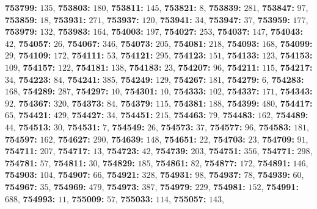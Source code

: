 \textsf{\bfseries 753799:} $135$, \textsf{\bfseries 753803:} $180$, \textsf{\bfseries 753811:} $145$, \textsf{\bfseries 753821:} $8$, \textsf{\bfseries 753839:} $281$, \textsf{\bfseries 753847:} $97$, \textsf{\bfseries 753859:} $18$, \textsf{\bfseries 753931:} $271$, \textsf{\bfseries 753937:} $120$, \textsf{\bfseries 753941:} $34$, \textsf{\bfseries 753947:} $37$, \textsf{\bfseries 753959:} $177$, \textsf{\bfseries 753979:} $132$, \textsf{\bfseries 753983:} $164$, \textsf{\bfseries 754003:} $197$, \textsf{\bfseries 754027:} $253$, \textsf{\bfseries 754037:} $147$, \textsf{\bfseries 754043:} $42$, \textsf{\bfseries 754057:} $26$, \textsf{\bfseries 754067:} $346$, \textsf{\bfseries 754073:} $205$, \textsf{\bfseries 754081:} $218$, \textsf{\bfseries 754093:} $168$, \textsf{\bfseries 754099:} $29$, \textsf{\bfseries 754109:} $172$, \textsf{\bfseries 754111:} $53$, \textsf{\bfseries 754121:} $295$, \textsf{\bfseries 754123:} $151$, \textsf{\bfseries 754133:} $123$, \textsf{\bfseries 754153:} $109$, \textsf{\bfseries 754157:} $122$, \textsf{\bfseries 754181:} $138$, \textsf{\bfseries 754183:} $23$, \textsf{\bfseries 754207:} $96$, \textsf{\bfseries 754211:} $115$, \textsf{\bfseries 754217:} $34$, \textsf{\bfseries 754223:} $84$, \textsf{\bfseries 754241:} $385$, \textsf{\bfseries 754249:} $129$, \textsf{\bfseries 754267:} $181$, \textsf{\bfseries 754279:} $6$, \textsf{\bfseries 754283:} $168$, \textsf{\bfseries 754289:} $287$, \textsf{\bfseries 754297:} $10$, \textsf{\bfseries 754301:} $10$, \textsf{\bfseries 754333:} $102$, \textsf{\bfseries 754337:} $171$, \textsf{\bfseries 754343:} $92$, \textsf{\bfseries 754367:} $320$, \textsf{\bfseries 754373:} $84$, \textsf{\bfseries 754379:} $115$, \textsf{\bfseries 754381:} $188$, \textsf{\bfseries 754399:} $480$, \textsf{\bfseries 754417:} $65$, \textsf{\bfseries 754421:} $429$, \textsf{\bfseries 754427:} $34$, \textsf{\bfseries 754451:} $215$, \textsf{\bfseries 754463:} $79$, \textsf{\bfseries 754483:} $162$, \textsf{\bfseries 754489:} $44$, \textsf{\bfseries 754513:} $30$, \textsf{\bfseries 754531:} $7$, \textsf{\bfseries 754549:} $26$, \textsf{\bfseries 754573:} $37$, \textsf{\bfseries 754577:} $96$, \textsf{\bfseries 754583:} $181$, \textsf{\bfseries 754597:} $162$, \textsf{\bfseries 754627:} $290$, \textsf{\bfseries 754639:} $148$, \textsf{\bfseries 754651:} $22$, \textsf{\bfseries 754703:} $23$, \textsf{\bfseries 754709:} $91$, \textsf{\bfseries 754711:} $207$, \textsf{\bfseries 754717:} $13$, \textsf{\bfseries 754723:} $42$, \textsf{\bfseries 754739:} $203$, \textsf{\bfseries 754751:} $356$, \textsf{\bfseries 754771:} $298$, \textsf{\bfseries 754781:} $57$, \textsf{\bfseries 754811:} $30$, \textsf{\bfseries 754829:} $185$, \textsf{\bfseries 754861:} $82$, \textsf{\bfseries 754877:} $172$, \textsf{\bfseries 754891:} $146$, \textsf{\bfseries 754903:} $104$, \textsf{\bfseries 754907:} $66$, \textsf{\bfseries 754921:} $328$, \textsf{\bfseries 754931:} $98$, \textsf{\bfseries 754937:} $78$, \textsf{\bfseries 754939:} $60$, \textsf{\bfseries 754967:} $35$, \textsf{\bfseries 754969:} $479$, \textsf{\bfseries 754973:} $387$, \textsf{\bfseries 754979:} $229$, \textsf{\bfseries 754981:} $152$, \textsf{\bfseries 754991:} $688$, \textsf{\bfseries 754993:} $11$, \textsf{\bfseries 755009:} $57$, \textsf{\bfseries 755033:} $114$, \textsf{\bfseries 755057:} $143$, 
